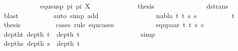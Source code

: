 \begin{isabellebody}
\ \ \ \ \ \ \ \ \ \ \isamarkupfalse%
\ {\isacharparenleft}{\kern0pt}equ{\isacharunderscore}{\kern0pt}susp\ pi{}\ pi{}\ X{\isacharparenright}{\kern0pt}\isanewline
\ \ \ \ \ \ \ \ \ \ \isamarkupfalse%
\ \isamarkupfalse%
\ {\isacharquery}{\kern0pt}thesis\ \isanewline
\ \ \ \ \ \ \ \ \ \ \ \ \isamarkupfalse%
\ ds{\isacharunderscore}{\kern0pt}trans\ {}\ \isamarkupfalse%
\ blast\isanewline
\ \ \ \ \ \ \ \ \isamarkupfalse%
\ {\isacharparenleft}{\kern0pt}auto\ simp\ add{\isacharcolon}{\kern0pt}\ {}{\isacharparenright}{\kern0pt}\isanewline
\ \ \ \ \ \isamarkupfalse%
\isanewline
\ \ \ \ \ \ \ \isamarkupfalse%
\ {\isacharparenleft}{\kern0pt}{}\ nabla\ t{}{\isacharprime}{\kern0pt}\ t{}{\isacharprime}{\kern0pt}\ s{}{\isacharprime}{\kern0pt}\ s{}{\isacharprime}{\kern0pt}{\isacharparenright}{\kern0pt}\isanewline
\ \ \ \ \ \ \ \ \isamarkupfalse%
\ t{}{}\ \isamarkupfalse%
\ {\isacharquery}{\kern0pt}thesis\ \isanewline
\ \ \ \ \ \ \ \ \isamarkupfalse%
{\isacharparenleft}{\kern0pt}cases\ rule{\isacharcolon}{\kern0pt}\ equ{\isachardot}{\kern0pt}cases{\isacharparenright}{\kern0pt}\isanewline
\ \ \ \ \ \ \ \ \ \ \isamarkupfalse%
\ {\isacharparenleft}{\kern0pt}equ{\isacharunderscore}{\kern0pt}paar\ t{}{\isacharprime}{\kern0pt}\ t{}{\isacharprime}{\kern0pt}\ s{}{\isacharprime}{\kern0pt}\ s{}{\isacharprime}{\kern0pt}{\isacharparenright}{\kern0pt}\isanewline
\ \ \ \ \ \ \ \ \ \ \isamarkupfalse%
\ deptht{}{\isacharcolon}{\kern0pt}\ {\isachardoublequoteopen}depth\ t{}{\isacharprime}{\kern0pt}\ {\isacharless}{\kern0pt}\ depth\ t{}{\isachardoublequoteclose}\ \isanewline
\ \ \ \ \ \ \ \ \ \ \ \ \isamarkupfalse%
\ {}{\isacharparenleft}{\kern0pt}{}{\isacharparenright}{\kern0pt}\ \isamarkupfalse%
\ simp\isanewline
\ \ \ \ \ \ \ \ \ \isamarkupfalse%
\ depths{}{\isacharcolon}{\kern0pt}\ {\isachardoublequoteopen}depth\ s{}{\isacharprime}{\kern0pt}\ {\isacharless}{\kern0pt}\ depth\ t{}{\isachardoublequoteclose}\ \isanewline
\ \ \ \ \ \ \ \ \ \ \ \isamarkupfalse%
\ {}{\isacharparenleft}{\kern0pt}{}{\isacharparenright}{\kern0pt}\ \isamarkupfalse%

\end{isabellebody}
